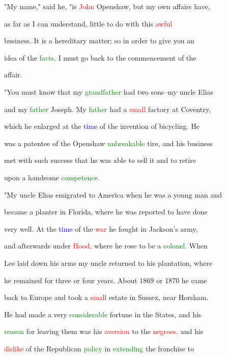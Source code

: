  "My name," said he, "is \textcolor{red}{John} Openshaw, but my own affairs have,

 as far as I can understand, little to do with this \textcolor{red}{awful}

 business. It is a hereditary matter; so in order to give you an

 idea of the \textcolor{green}{facts,} I must go back to the commencement of the

 affair.



 "You must know that my \textcolor{green}{grandfather} had two sons--my uncle Elias

 and my \textcolor{green}{father} Joseph. My \textcolor{green}{father} had a \textcolor{red}{small} factory at Coventry,

 which he enlarged at the \textcolor{blue}{time} of the invention of bicycling. He

 was a patentee of the Openshaw \textcolor{green}{unbreakable} tire, and his business

 met with such \textcolor{BurntOrange}{success} that he was able to sell it and to retire

 upon a handsome \textcolor{green}{competence.}



 "My uncle Elias emigrated to America when he was a \textcolor{BurntOrange}{young} man and

 became a planter in Florida, where he was reported to have done

 very well. At the \textcolor{blue}{time} of the \textcolor{red}{war} he fought in Jackson's army,

 and afterwards under \textcolor{red}{Hood,} where he rose to be a \textcolor{green}{colonel.} When

 Lee laid down his arms my uncle returned to his plantation, where

 he remained for three or four years. About 1869 or 1870 he came

 back to Europe and took a \textcolor{red}{small} estate in Sussex, near Horsham.

 He had made a very \textcolor{green}{considerable} \textcolor{BurntOrange}{fortune} in the States, and his

 \textcolor{green}{reason} for \textcolor{BurntOrange}{leaving} them was his \textcolor{red}{aversion} to the \textcolor{red}{negroes,} and his

 \textcolor{red}{dislike} of the Republican \textcolor{green}{policy} in \textcolor{green}{extending} the franchise to

